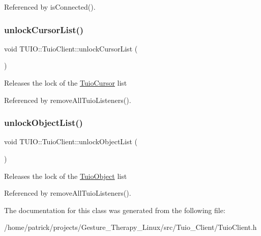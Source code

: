 Referenced by is\+Connected().

\mbox{\label{class_t_u_i_o_1_1_tuio_client_a3b87ab82c8249cb994577864b6ff8044}} 
\subsubsection{\texorpdfstring{unlock\+Cursor\+List()}{unlockCursorList()}}
{\footnotesize\ttfamily void T\+U\+I\+O\+::\+Tuio\+Client\+::unlock\+Cursor\+List (\begin{DoxyParamCaption}{ }\end{DoxyParamCaption})}

Releases the lock of the \hyperlink{class_t_u_i_o_1_1_tuio_cursor}{Tuio\+Cursor} list 

Referenced by remove\+All\+Tuio\+Listeners().

\mbox{\label{class_t_u_i_o_1_1_tuio_client_aaa87c7597c0527c25b34c92945b19b21}} 
\subsubsection{\texorpdfstring{unlock\+Object\+List()}{unlockObjectList()}}
{\footnotesize\ttfamily void T\+U\+I\+O\+::\+Tuio\+Client\+::unlock\+Object\+List (\begin{DoxyParamCaption}{ }\end{DoxyParamCaption})}

Releases the lock of the \hyperlink{class_t_u_i_o_1_1_tuio_object}{Tuio\+Object} list 

Referenced by remove\+All\+Tuio\+Listeners().



The documentation for this class was generated from the following file\+:\begin{DoxyCompactItemize}
\item 
/home/patrick/projects/\+Gesture\+\_\+\+Therapy\+\_\+\+Linux/src/\+Tuio\+\_\+\+Client/Tuio\+Client.\+h\end{DoxyCompactItemize}
